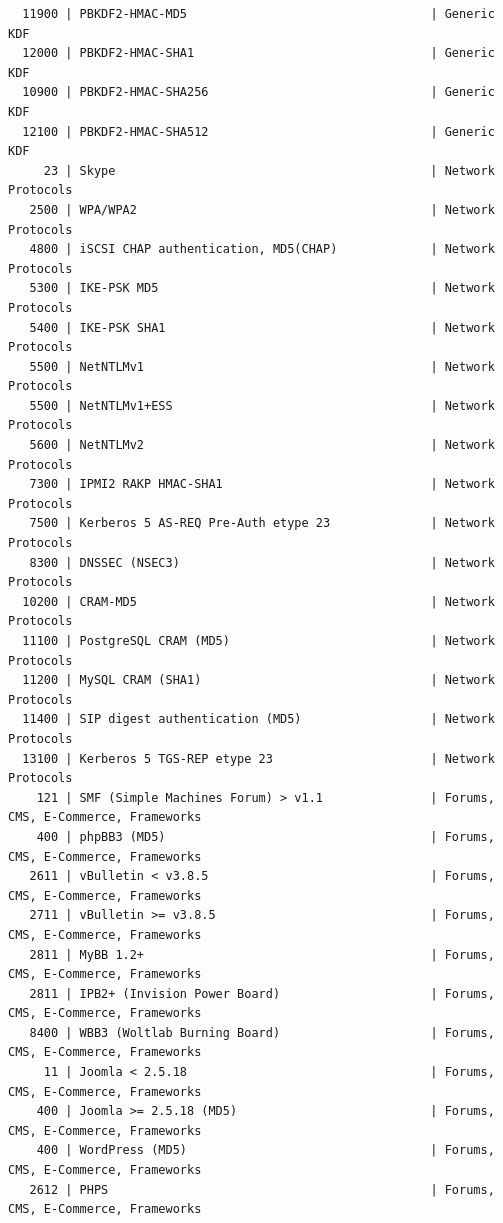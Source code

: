 \documentclass{article}
\begin{document}
\begin{lstlisting}
  11900 | PBKDF2-HMAC-MD5                                  | Generic KDF
  12000 | PBKDF2-HMAC-SHA1                                 | Generic KDF
  10900 | PBKDF2-HMAC-SHA256                               | Generic KDF
  12100 | PBKDF2-HMAC-SHA512                               | Generic KDF
     23 | Skype                                            | Network Protocols
   2500 | WPA/WPA2                                         | Network Protocols
   4800 | iSCSI CHAP authentication, MD5(CHAP)             | Network Protocols
   5300 | IKE-PSK MD5                                      | Network Protocols
   5400 | IKE-PSK SHA1                                     | Network Protocols
   5500 | NetNTLMv1                                        | Network Protocols
   5500 | NetNTLMv1+ESS                                    | Network Protocols
   5600 | NetNTLMv2                                        | Network Protocols
   7300 | IPMI2 RAKP HMAC-SHA1                             | Network Protocols
   7500 | Kerberos 5 AS-REQ Pre-Auth etype 23              | Network Protocols
   8300 | DNSSEC (NSEC3)                                   | Network Protocols
  10200 | CRAM-MD5                                         | Network Protocols
  11100 | PostgreSQL CRAM (MD5)                            | Network Protocols
  11200 | MySQL CRAM (SHA1)                                | Network Protocols
  11400 | SIP digest authentication (MD5)                  | Network Protocols
  13100 | Kerberos 5 TGS-REP etype 23                      | Network Protocols
    121 | SMF (Simple Machines Forum) > v1.1               | Forums, CMS, E-Commerce, Frameworks
    400 | phpBB3 (MD5)                                     | Forums, CMS, E-Commerce, Frameworks
   2611 | vBulletin < v3.8.5                               | Forums, CMS, E-Commerce, Frameworks
   2711 | vBulletin >= v3.8.5                              | Forums, CMS, E-Commerce, Frameworks
   2811 | MyBB 1.2+                                        | Forums, CMS, E-Commerce, Frameworks
   2811 | IPB2+ (Invision Power Board)                     | Forums, CMS, E-Commerce, Frameworks
   8400 | WBB3 (Woltlab Burning Board)                     | Forums, CMS, E-Commerce, Frameworks
     11 | Joomla < 2.5.18                                  | Forums, CMS, E-Commerce, Frameworks
    400 | Joomla >= 2.5.18 (MD5)                           | Forums, CMS, E-Commerce, Frameworks
    400 | WordPress (MD5)                                  | Forums, CMS, E-Commerce, Frameworks
   2612 | PHPS                                             | Forums, CMS, E-Commerce, Frameworks

\end{lstlisting}
\end{document}

